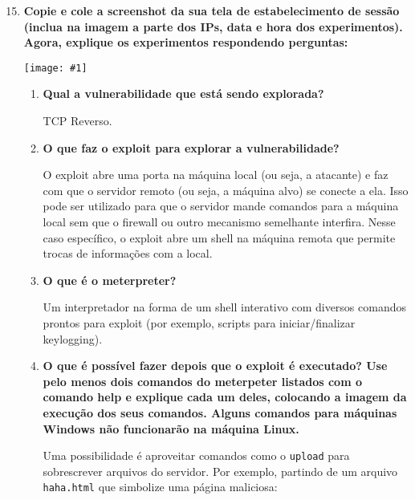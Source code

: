 \documentclass{article}
\newcommand{\code}[1]{\texttt{#1}}
\newcommand{\img}[1]{%
    \texttt{[image: \#1]}
}
\begin{document}
    \begin{enumerate}
        \setcounter{enumi}{14}
        \item \textbf{Copie e cole a screenshot da sua tela de
                estabelecimento de sessão (inclua na imagem a parte dos
                IPs, data e hora dos experimentos). Agora, explique os
                experimentos respondendo perguntas:}

            \img{imgs/payloads}

        \begin{enumerate}
            \item \textbf{Qual a vulnerabilidade que está sendo explorada?}

                TCP Reverso.

            \item \textbf{O que faz o exploit para explorar a
                vulnerabilidade?}

                O exploit abre uma porta na máquina local (ou seja, a atacante)
                e faz com que o servidor remoto (ou seja, a máquina alvo) se
                conecte a ela. Isso pode ser utilizado para que o servidor
                mande comandos para a máquina local sem que o firewall ou outro
                mecanismo semelhante interfira. Nesse caso específico, o
                exploit abre um shell na máquina remota que permite trocas de
                informações com a local.

            \item \textbf{O que é o meterpreter?}

                Um interpretador na forma de um shell interativo com diversos
                comandos prontos para exploit (por exemplo, scripts para
                iniciar/finalizar keylogging).

            \item \textbf{O que é possível fazer depois que o exploit é
                    executado? Use pelo menos dois comandos do meterpeter
                    listados com o comando help e explique cada um deles,
                    colocando a imagem da execução dos seus comandos. Alguns
                    comandos para máquinas Windows não funcionarão na máquina
                Linux.}

                Uma possibilidade é aproveitar comandos como o \code{upload}
                para sobrescrever arquivos do servidor. Por exemplo, partindo
                de um arquivo \code{haha.html} que simbolize uma página
                maliciosa:


\end{enumerate}
\end{enumerate}
\end{document}
